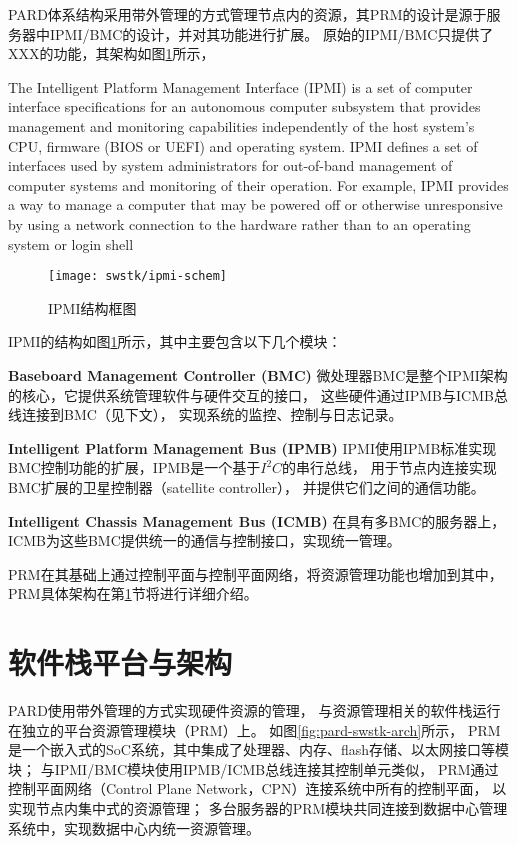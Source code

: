 PARD体系结构采用带外管理的方式管理节点内的资源，其PRM的设计是源于服务器中IPMI/BMC的设计，并对其功能进行扩展。
原始的IPMI/BMC只提供了XXX的功能，其架构如图\ref{fig:ipmi-schem}所示，

The Intelligent Platform Management Interface (IPMI) is a set of computer interface specifications for an autonomous computer subsystem that provides management and monitoring capabilities independently of the host system's CPU, firmware (BIOS or UEFI) and operating system. IPMI defines a set of interfaces used by system administrators for out-of-band management of computer systems and monitoring of their operation. For example, IPMI provides a way to manage a computer that may be powered off or otherwise unresponsive by using a network connection to the hardware rather than to an operating system or login shell

\begin{figure}[tb]
  \centering
  \texttt{[image: swstk/ipmi-schem]}
  \caption{IPMI结构框图}
  \label{fig:ipmi-schem}
\end{figure}

IPMI的结构如图\ref{fig:ipmi-schem}所示，其中主要包含以下几个模块：

\textbf{Baseboard Management Controller (BMC)}\quad
微处理器BMC是整个IPMI架构的核心，它提供系统管理软件与硬件交互的接口，
这些硬件通过IPMB与ICMB总线连接到BMC（见下文），
实现系统的监控、控制与日志记录。

\textbf{Intelligent Platform Management Bus (IPMB)}\quad
IPMI使用IPMB标准实现BMC控制功能的扩展，IPMB是一个基于$I^2C$的串行总线，
用于节点内连接实现BMC扩展的卫星控制器（satellite controller），
并提供它们之间的通信功能。

\textbf{Intelligent Chassis Management Bus (ICMB)}\quad
在具有多BMC的服务器上，ICMB为这些BMC提供统一的通信与控制接口，实现统一管理。

PRM在其基础上通过控制平面与控制平面网络，将资源管理功能也增加到其中，PRM具体架构在第\ref{chap:prm:arch}节将进行详细介绍。

\section{软件栈平台与架构}
\label{chap:prm:arch}

PARD使用带外管理的方式实现硬件资源的管理，
与资源管理相关的软件栈运行在独立的平台资源管理模块（PRM）上。
如图\ref{fig:pard-swstk-arch}所示，
PRM是一个嵌入式的SoC系统，其中集成了处理器、内存、flash存储、以太网接口等模块；
与IPMI/BMC模块使用IPMB/ICMB总线连接其控制单元类似，
PRM通过控制平面网络（Control Plane Network，CPN）连接系统中所有的控制平面，
以实现节点内集中式的资源管理；
多台服务器的PRM模块共同连接到数据中心管理系统中，实现数据中心内统一资源管理。

